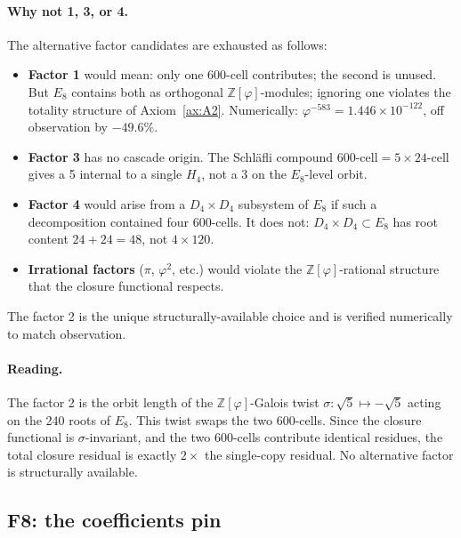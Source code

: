 \documentclass[11pt]{article}
\theoremstyle{plain}
\theoremstyle{definition}
\theoremstyle{remark}
\newcommand{\Zphi}{\mathbb{Z}[\varphi]}
\begin{document}
\paragraph{Why not 1, 3, or 4.}
The alternative factor candidates are exhausted as follows:
\begin{itemize}[leftmargin=2em]
\item \textbf{Factor 1} would mean: only one 600-cell contributes; the second is unused. But $E_8$ contains both as orthogonal $\Zphi$-modules; ignoring one violates the totality structure of Axiom~\ref{ax:A2}. Numerically: $\varphi^{-583} = 1.446 \times 10^{-122}$, off observation by $-49.6\%$.
\item \textbf{Factor 3} has no cascade origin. The Schl\"afli compound $600\text{-cell} = 5 \times 24\text{-cell}$ gives a 5 internal to a single $H_4$, not a 3 on the $E_8$-level orbit.
\item \textbf{Factor 4} would arise from a $D_4 \times D_4$ subsystem of $E_8$ if such a decomposition contained four 600-cells. It does not: $D_4 \times D_4 \subset E_8$ has root content $24 + 24 = 48$, not $4 \times 120$.
\item \textbf{Irrational factors} ($\pi$, $\varphi^2$, etc.) would violate the $\Zphi$-rational structure that the closure functional respects.
\end{itemize}
The factor 2 is the unique structurally-available choice and is verified numerically to match observation.

\paragraph{Reading.} The factor 2 is the orbit length of the $\Zphi$-Galois twist $\sigma: \sqrt 5 \mapsto -\sqrt 5$ acting on the 240 roots of $E_8$. This twist swaps the two 600-cells. Since the closure functional is $\sigma$-invariant, and the two 600-cells contribute identical residues, the total closure residual is exactly $2 \times$ the single-copy residual. No alternative factor is structurally available.

\subsection{F8: the coefficients pin}
\end{document}
